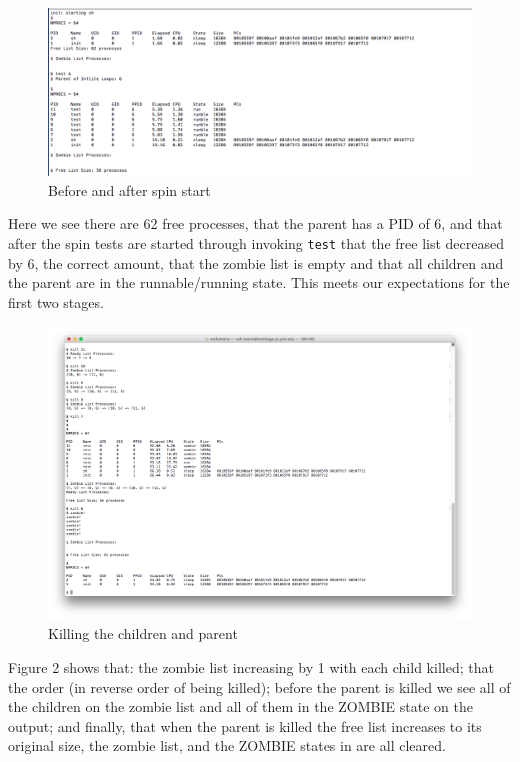 \documentclass[11pt,letterpaper]{report}
\begin{document}
\pagebreak

\begin{figure}[h]
\centering
\includegraphics[width=0.8\linewidth]{shell-kill1.png}
\caption{Before and after spin start}
\label{fig:1}
\end{figure}

Here we see there are 62 free processes, that the parent has a PID of 6, and that after the spin tests are started through invoking {\tt test} that the free list decreased by 6, the correct amount, that the zombie list is empty and
that all children and the parent are in the runnable/running state. This meets our expectations for the first two stages.

\pagebreak


\begin{figure}[h]
\centering
\includegraphics[width=0.8\linewidth]{shell-kill2.png}
\caption{Killing the children and parent}
\label{fig:2}
\end{figure}

Figure 2 shows that: the zombie list increasing by 1 with each child killed; that the order (in reverse order of being killed); before the parent is killed we see all of the children on the zombie list and all of them in the ZOMBIE state
on the  output; and finally, that when the parent is killed the free list increases to its original size, the zombie list, and the ZOMBIE states in  are all cleared.
\end{document}
